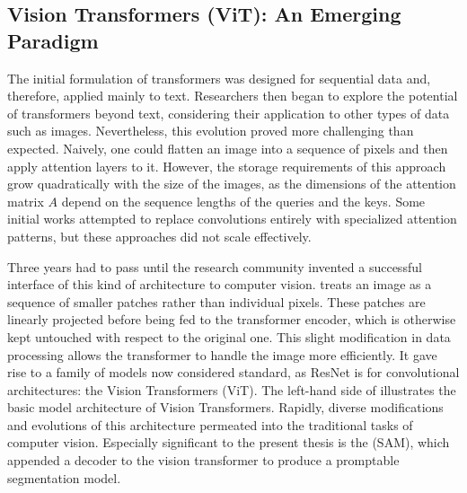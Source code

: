 \subsection{Vision Transformers (ViT): An Emerging Paradigm}\label{subsec:vision_transformer}
The initial formulation of transformers was designed for sequential data and, therefore, applied mainly to text. Researchers then began to explore the potential of transformers beyond text, considering their application to other types of data such as images. Nevertheless, this evolution proved more challenging than expected. Naively, one could flatten an image into a sequence of pixels and then apply attention layers to it. However, the storage requirements of this approach grow quadratically with the size of the images, as the dimensions of the attention matrix $A$ depend on the sequence lengths of the queries and the keys. Some initial works attempted to replace convolutions entirely with specialized attention patterns, but these approaches did not scale effectively.


Three years had to pass until the research community invented a successful interface of this kind of architecture to computer vision.  treats an image as a sequence of smaller patches rather than individual pixels. These patches are linearly projected before being fed to the transformer encoder, which is otherwise kept untouched with respect to the original one. This slight modification in data processing allows the transformer to handle the image more efficiently. It gave rise to a family of models now considered standard, as ResNet is for convolutional architectures: the Vision Transformers (ViT). The left-hand side of  illustrates the basic model architecture of Vision Transformers. Rapidly, diverse modifications and evolutions of this architecture permeated into the traditional tasks of computer vision. Especially significant to the present thesis is the  (SAM), which appended a decoder to the vision transformer to produce a promptable segmentation model. 

